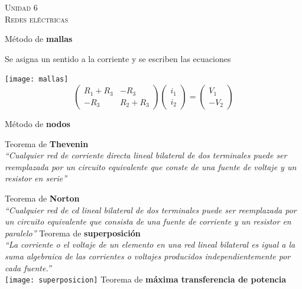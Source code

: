 \documentclass[11pt,a4paper,twocolumn]{article}
\newcommand{\unidad}[2]{\begin{center}
		\fontsize{10}{10}\selectfont\color{gray!50!black}\scshape Unidad #1 \\
		\fontsize{14}{14}\selectfont \scshape #2
\end{center} \vspace{-.6cm}}
\begin{document}
\unidad{6}{Redes eléctricas}
\begin{cajita}

Método de \textbf{mallas}

Se asigna un sentido a la corriente y se escriben las ecuaciones

\begin{center}
	
\texttt{[image: mallas]}
\vspace{-.3cm}
\begin{equation}
	\begin{pmatrix}
		R_1 + R_3 & - R_3 \\
		- R_3 	& R_2 + R_3
	\end{pmatrix} \begin{pmatrix}
	i_1 \\
	i_2
\end{pmatrix} = \begin{pmatrix}
	V_1 \\
	- V_2
\end{pmatrix}
\end{equation}

\end{center}



Método de \textbf{nodos}

\vspace{0.1cm}
Teorema de \textbf{Thevenin}\\
\textit{``Cualquier red de corriente directa lineal bilateral de dos terminales puede ser reemplazada por un circuito equivalente que conste de una fuente
de voltaje y un resistor en serie''}
\vspace{0.1cm}


Teorema de \textbf{Norton}\\
\textit{ ``Cualquier red de cd lineal bilateral de dos terminales puede ser reemplazada	por un circuito equivalente que consista de una fuente de corriente y un
	resistor en paralelo''}
\vspace{0.1cm}
Teorema de \textbf{superposición}\\
\textit{``La corriente o el voltaje de un elemento en una red lineal bilateral es igual a la suma algebraica de las corrientes o voltajes producidos independientemente por cada fuente.''}\\
\texttt{[image: superposicion]}
\vspace{-.3cm}
\vspace{0.1cm}
Teorema de \textbf{máxima transferencia de potencia}
	
	
\end{cajita}
\end{document}
